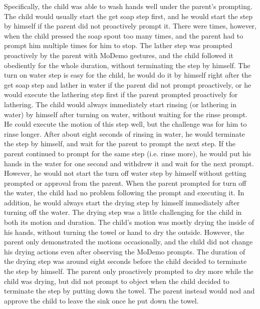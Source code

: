 \documentclass{ut-thesis}
\begin{document}
Specifically, the child was able to wash hands well under the parent's prompting.  The child would usually start the get soap step first, and he would start the step by himself if the parent did not proactively prompt it.  There were times, however, when the child pressed the soap spout too many times, and the parent had to prompt him multiple times for him to stop.  The lather step was prompted proactively by the parent with MoDemo gestures, and the child followed it obediently for the whole duration, without terminating the step by himself.  The turn on water step is easy for the child, he would do it by himself right after the get soap step and lather in water if the parent did not prompt proactively, or he would execute the lathering step first if the parent prompted proactively for lathering.  The child would always immediately start rinsing (or lathering in water) by himself after turning on water, without waiting for the rinse prompt.  He could execute the motion of this step well, but the challenge was for him to rinse longer.  After about eight seconds of rinsing in water, he would terminate the step by himself, and wait for the parent to prompt the next step.  If the parent continued to prompt for the same step (i.e. rinse more), he would put his hands in the water for one second and withdrew it and wait for the next prompt.  However, he would not start the turn off water step by himself without getting prompted or approval from the parent.  When the parent prompted for turn off the water, the child had no problem following the prompt and executing it.  In addition, he would always start the drying step by himself immediately after turning off the water.  The drying step was a little challenging for the child in both its motion and duration.  The child's motion was mostly drying the inside of his hands, without turning the towel or hand to dry the outside.  However, the parent only demonstrated the motions occasionally, and the child did not change his drying actions even after observing the MoDemo prompts.  The duration of the drying step was around eight seconds before the child decided to terminate the step by himself.  The parent only proactively prompted to dry more while the child was drying, but did not prompt to object when the child decided to terminate the step by putting down the towel.  The parent instead would nod and approve the child to leave the sink once he put down the towel.
\end{document}
